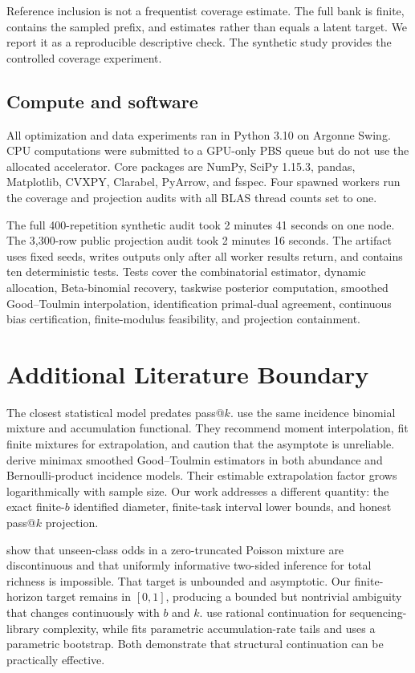\documentclass[twoside]{article}
\begin{document}
Reference inclusion is not a frequentist coverage estimate. The full bank is
finite, contains the sampled prefix, and estimates rather than equals a latent
target. We report it as a reproducible descriptive check. The synthetic study
provides the controlled coverage experiment.

\subsection{Compute and software}

All optimization and data experiments ran in Python 3.10 on Argonne Swing.
CPU computations were submitted to a GPU-only PBS queue but do not use the
allocated accelerator. Core packages are NumPy, SciPy 1.15.3, pandas,
Matplotlib, CVXPY, Clarabel, PyArrow, and fsspec. Four spawned workers run the
coverage and projection audits with all BLAS thread counts set to one.

The full 400-repetition synthetic audit took 2 minutes 41 seconds on one node.
The 3,300-row public projection audit took 2 minutes 16 seconds. The artifact
uses fixed seeds, writes outputs only after all worker results return, and
contains ten deterministic tests. Tests cover the combinatorial estimator,
dynamic allocation, Beta-binomial recovery, taskwise posterior computation,
smoothed Good--Toulmin interpolation, identification primal-dual agreement,
continuous bias certification, finite-modulus feasibility, and projection
containment.

\section{Additional Literature Boundary}

The closest statistical model predates pass@\(k\). \citet{colwell2004} use the
same incidence binomial mixture and accumulation functional. They recommend
moment interpolation, fit finite mixtures for extrapolation, and caution that
the asymptote is unreliable. \citet{orlitsky2016} derive minimax smoothed
Good--Toulmin estimators in both abundance and Bernoulli-product incidence
models. Their estimable extrapolation factor grows logarithmically with sample
size. Our work addresses a different quantity: the exact finite-\(b\)
identified diameter, finite-task interval lower bounds, and honest pass@\(k\)
projection.

\citet{mao2007} show that unseen-class odds in a zero-truncated Poisson
mixture are discontinuous and that uniformly informative two-sided inference
for total richness is impossible. That target is unbounded and asymptotic.
Our finite-horizon target remains in \([0,1]\), producing a bounded but
nontrivial ambiguity that changes continuously with \(b\) and \(k\).
\citet{daley2013} use rational continuation for sequencing-library complexity,
while \citet{shestopaloff2025} fits parametric accumulation-rate tails and
uses a parametric bootstrap. Both demonstrate that structural continuation
can be practically effective.
\end{document}

